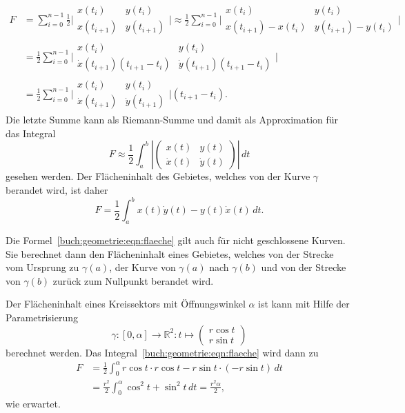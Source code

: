 \begin{align*}
F
&=
\sum_{i=0}^{n-1}
\frac12
\biggl|\begin{matrix}
x(t_i)    &y(t_i)    \\
x(t_{i+1})&y(t_{i+1})
\end{matrix}\biggr|
\approx
\frac12
\sum_{i=0}^{n-1}
\biggl|\begin{matrix}
x(t_i)    &y(t_i)    \\
x(t_{i+1})-x(t_i)&y(t_{i+1})-y(t_i)
\end{matrix}\biggr|
\\
&=
\frac12
\sum_{i=0}^{n-1}
\biggl|\begin{matrix}
x(t_i)                        &y(t_i)    \\
\dot{x}(t_{i+1}) (t_{i+1}-t_i)& \dot{y}(t_{i+1}) (t_{i+1}-t_i)
\end{matrix}\biggr|
\\
&=
\frac12
\sum_{i=0}^{n-1}
\biggl|\begin{matrix}
x(t_i)           &y(t_i)    \\
\dot{x}(t_{i+1}) & \dot{y}(t_{i+1})
\end{matrix}\biggr|
(t_{i+1}-t_{i}).
\end{align*}
Die letzte Summe kann als Riemann-Summe und damit als Approximation für
das Integral
\[
F
\approx
\frac12
\int_a^b
\left|\begin{pmatrix} x(t)&y(t)\\\dot{x}(t)&\dot{y}(t)\end{pmatrix}\right|
\,dt
\]
gesehen werden.
Der Flächeninhalt des Gebietes, welches von der Kurve $\gamma$
berandet wird, ist daher
\begin{equation}
F
=
\frac12
\int_a^b x(t)\dot{y}(t)-y(t)\dot{x}(t)\,dt.
\label{buch:geometrie:eqn:flaeche}
\end{equation}

Die Formel~\eqref{buch:geometrie:eqn:flaeche} gilt auch für nicht
geschlossene Kurven.
Sie berechnet dann den Flächeninhalt eines Gebietes, welches von
der Strecke vom Ursprung zu $\gamma(a)$, der Kurve von $\gamma(a)$ nach
$\gamma(b)$ und von der Strecke von $\gamma(b)$ zurück zum Nullpunkt
berandet wird.

\begin{beispiel}
Der Flächeninhalt eines Kreissektors mit Öffnungswinkel $\alpha$ ist
kann mit Hilfe der Parametrisierung
\[
\gamma
\colon
[0,\alpha] \to \mathbb{R}^2
:
t\mapsto \begin{pmatrix}r\cos t\\ r\sin t\end{pmatrix}
\]
berechnet werden.
Das Integral~\eqref{buch:geometrie:eqn:flaeche} wird dann zu
\begin{align*}
F
&=
\frac12
\int_0^\alpha r\cos t \cdot r\cos t - r\sin t \cdot (-r\sin t)\,dt
\\
&=
\frac{r^2}2
\int_0^\alpha
\cos^2t + \sin^2t\,dt
=
\frac{r^2\alpha}2,
\end{align*}
wie erwartet.
\end{beispiel}

